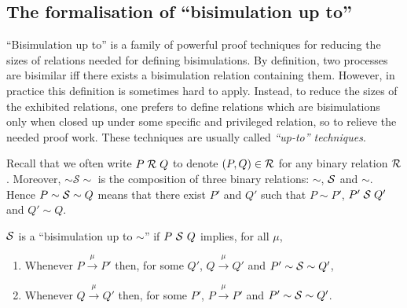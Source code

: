 \subsection{The formalisation of ``bisimulation up to''}

``Bisimulation up to'' is a family of powerful proof techniques
for reducing the sizes of relations needed for defining bisimulations.
By definition, two processes are bisimilar iff there exists a
bisimulation relation containing them. However, in practice
this definition is sometimes  hard to apply. Instead, to reduce
the sizes of the exhibited relations, one prefers to define relations
which are bisimulations only when closed up under some specific and
privileged relation, so to relieve the needed proof work. These
techniques are usually called \emph{``up-to'' techniques}.

Recall that we often write $P \;\R\; Q$ to denote
$(P, Q) \in \R$ for any binary relation $\R$. 
Moreover, 
 $\sim \mathcal{S} \sim$ is the composition of three binary
relations: $\sim$, $\S$ and $\sim$. Hence $P \sim \S \sim Q$ means that
there exist $P'$ and $Q'$ such that $P \sim P'$, $P' \;\S\; Q'$ and $Q' \sim Q$.
\begin{definition}%
  \label{def:bisimUptoSim}
$\S$ is a ``bisimulation up to $\sim$'' if $P\ \S\ Q$ implies, for all $\mu$,
\begin{enumerate}
\item Whenever $P \overset{\mu}{\rightarrow} P'$ then, for some
  $Q'$, $Q \overset{\mu}{\rightarrow} Q'$ and $P' \sim \S
  \sim Q'$,
\item Whenever $Q \overset{\mu}{\rightarrow} Q'$ then, for some
  $P'$, $P \overset{\mu}{\rightarrow} P'$ and $P' \sim \S
  \sim Q'$.
\end{enumerate}
\end{definition}

